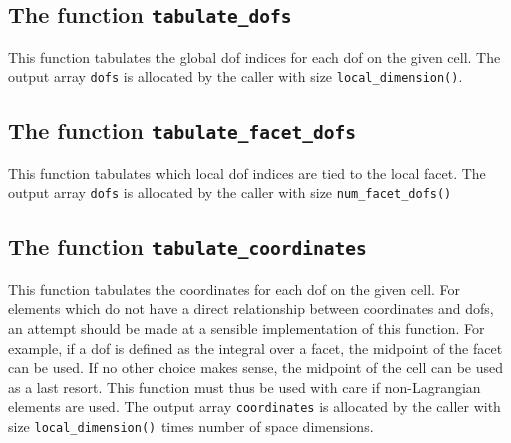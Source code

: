 
\subsection{The function \texttt{tabulate\_dofs}}
This function tabulates the global dof indices for each dof on the given cell.
The output array \texttt{dofs} is allocated by the caller with size \texttt{local\_dimension()}.


\subsection{The function \texttt{tabulate\_facet\_dofs}}
This function tabulates which local dof indices are tied to the local facet.
The output array \texttt{dofs} is allocated by the caller with size \texttt{num\_facet\_dofs()}


\subsection{The function \texttt{tabulate\_coordinates}}
This function tabulates the coordinates for each dof on the given cell.
For elements which do not have a direct relationship between coordinates and dofs,
an attempt should be made at a sensible implementation of this function.
For example, if a dof is defined as the integral over a facet, the midpoint
of the facet can be used. If no other choice makes sense, the midpoint of the cell
can be used as a last resort. This function must thus be used with care if
non-Lagrangian elements are used.
The output array \texttt{coordinates} is allocated by the caller with size \texttt{local\_dimension()} times number of space dimensions.


